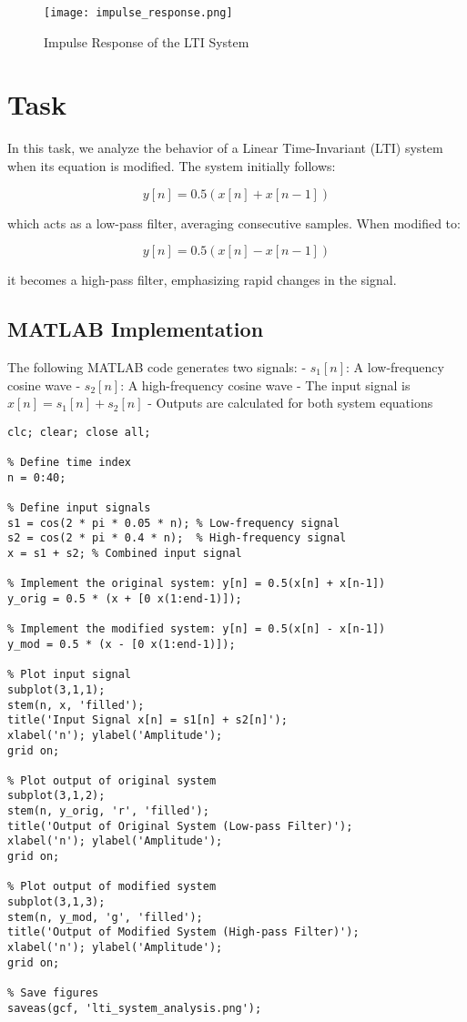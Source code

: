\documentclass[a4paper,12pt]{article}
\begin{document}
\begin{figure}[H]
    \centering
    \texttt{[image: impulse\_response.png]}
    \caption{Impulse Response of the LTI System}
    \label{fig:impulse_response}
\end{figure}

\section{Task} 
In this task, we analyze the behavior of a Linear Time-Invariant (LTI) system when its equation is modified. The system initially follows:

\[
y[n] = 0.5(x[n] + x[n-1])
\]

which acts as a low-pass filter, averaging consecutive samples. When modified to:

\[
y[n] = 0.5(x[n] - x[n-1])
\]

it becomes a high-pass filter, emphasizing rapid changes in the signal.

\subsection{MATLAB Implementation}
The following MATLAB code generates two signals:
- \( s_1[n] \): A low-frequency cosine wave
- \( s_2[n] \): A high-frequency cosine wave
- The input signal is \( x[n] = s_1[n] + s_2[n] \)
- Outputs are calculated for both system equations

\begin{verbatim}
clc; clear; close all;

% Define time index
n = 0:40;

% Define input signals
s1 = cos(2 * pi * 0.05 * n); % Low-frequency signal
s2 = cos(2 * pi * 0.4 * n);  % High-frequency signal
x = s1 + s2; % Combined input signal

% Implement the original system: y[n] = 0.5(x[n] + x[n-1])
y_orig = 0.5 * (x + [0 x(1:end-1)]); 

% Implement the modified system: y[n] = 0.5(x[n] - x[n-1])
y_mod = 0.5 * (x - [0 x(1:end-1)]);

% Plot input signal
subplot(3,1,1);
stem(n, x, 'filled');
title('Input Signal x[n] = s1[n] + s2[n]');
xlabel('n'); ylabel('Amplitude');
grid on;

% Plot output of original system
subplot(3,1,2);
stem(n, y_orig, 'r', 'filled');
title('Output of Original System (Low-pass Filter)');
xlabel('n'); ylabel('Amplitude');
grid on;

% Plot output of modified system
subplot(3,1,3);
stem(n, y_mod, 'g', 'filled');
title('Output of Modified System (High-pass Filter)');
xlabel('n'); ylabel('Amplitude');
grid on; 

% Save figures
saveas(gcf, 'lti_system_analysis.png');
\end{verbatim}
\end{document}
